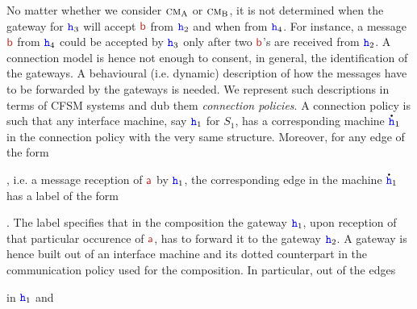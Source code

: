 No matter whether we consider $\text{\sc cm}_\mathrm{A}$ or $\text{\sc cm}_\mathrm{B}$, it is
not determined when the gateway for ${\mathtt{\color{blue}{ {h}}}}_3$ will accept $\msg[b]$ 
from ${\mathtt{\color{blue}{ {h}}}}_2$ and when from ${\mathtt{\color{blue}{ {h}}}}_4$.
For instance,  
a message $\msg[b]$ from ${\mathtt{\color{blue}{ {h}}}}_4$ could be accepted by ${\mathtt{\color{blue}{ {h}}}}_3$ only after two $\msg[b]$'s are received from ${\mathtt{\color{blue}{ {h}}}}_2$.
A connection model is hence not enough to consent, in general, the identification of the gateways. 
A behavioural (i.e. dynamic) description of how the messages have to be
forwarded by the gateways is needed.
We represent such descriptions in terms of CFSM systems and dub them {\em connection policies}.
A connection policy is such that any interface machine, say ${\mathtt{\color{blue}{ {h}}}}_1$ for $S_1$,  has a corresponding
machine $\accentset{\mbox{\large\bfseries .}}{{ \ensuremath{\mathtt{\color{blue}{ {h}}}} }}_1$ in the connection policy with the very same structure. Moreover, for any edge of the form 
\raisebox{2mm}
{
 }, i.e. a message reception of $\msg[a]$ by ${\mathtt{\color{blue}{ {h}}}}_1$,  
 the corresponding edge in the machine $\accentset{\mbox{\large\bfseries .}}{{ \ensuremath{\mathtt{\color{blue}{ {h}}}} }}_1$ has a label of the form
 \raisebox{2mm}
{
 }. The label specifies that in the composition the gateway ${\mathtt{\color{blue}{ {h}}}}_1$, upon reception of that particular occurence of 
 $\msg[a]$, has to forward it to the gateway ${\mathtt{\color{blue}{ {h}}}}_2$.
A gateway is hence built out of an interface machine and its dotted counterpart in the
communication policy used for the composition. 
 \vspace{-1mm} In particular, out of the edges 
\raisebox{2mm}
{
 } 
 in ${\mathtt{\color{blue}{ {h}}}}_1$ and 
 \raisebox{2mm}
{
 }  
